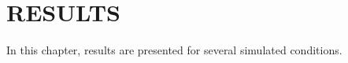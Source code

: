 %
%
%
%
%
%
%

\chapter{RESULTS} \label{chap:results}
In this chapter, results are presented for several simulated conditions.


